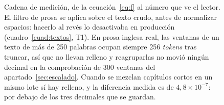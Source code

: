 \documentclass[11pt,a4paper]{article}
\newcommand{\pct}{\,\%}
\begin{document}
\begin{figure}[htbp]
\caption[Cadena de medición de LiteraLevel]{Cadena de medición, de la ecuación~\eqref{eq:f}
al número que ve el lector. El filtro de prosa se aplica sobre el texto crudo, antes de
normalizar espacios: hacerlo al revés lo desactivaba en producción (cuadro~\ref{cuad:textos},
T1). En prosa inglesa real, las ventanas de un texto de más de 250 palabras ocupan
siempre 256 \emph{tokens} tras truncar, así que no llevan relleno y reagruparlas no movió ningún decimal en la
comprobación de 300 ventanas del apartado~\ref{sec:escalado}. Cuando se mezclan capítulos
cortos en un mismo lote sí hay relleno, y la diferencia medida es de
$4{,}8\times 10^{-7}$: por debajo de los tres decimales que se guardan.}
\label{fig:pipeline}
\end{figure}
\end{document}
